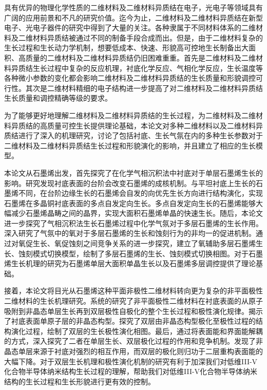 \begin{chineseabstract}
    具有优异的物理化学性质的二维材料及二维材料异质结在电子，光电子等领域具有广阔的应用前景和不凡的研究价值。迄今为止，二维材料及二维材料异质结在新型电子、光电子器件的研究中得到了大量的关注。各种隶属于不同材料体系的二维材料及二维材料异质结被通过不同的制备手段合成而出。但是，由于二维材料复杂的生长过程和生长动力学机制，想要低成本、快速、形貌高可控地生长制备出大面积、高质量的二维材料及二维材料异质结仍旧困难重重。首先是二维材料及二维材料异质结生长过程中复杂的反应机理，衬底化学反应、气相化学反应，生长温度等各种微小参数的变化都会影响二维材料及二维材料异质结的生长质量和形貌调控可行性。其次是二维材料精细的电子结构进一步提高了对二维材料及二维材料异质结生长质量和调控精确等级的要求。
    
    为了能够更好地理解二维材料及二维材料异质结的生长过程，为二维材料及二维材料异质结的高质量可控生长提供理论基础，本论文对多种二维材料以及二维材料异质结进行了深入的机理研究，讨论了包括衬底、生长气氛在内的多种生长参数对于二维材料及二维材料异质结生长过程和形貌演化的影响，并且建立了相应的生长模型。

    本论文从石墨烯出发，首先探究了在化学气相沉积法中衬底对于单层石墨烯生长的影响。研究发现衬底表面的台阶会改变石墨烯的成核机制。与平坦衬底上生长的石墨烯不同，在台阶边缘生长的石墨烯会自发的向优先生长方向进行结构演化，实现石墨烯在多晶铜衬底表面的多点自发定向生长。多点自发定向生长的石墨烯能够大幅减少石墨烯晶畴之间的晶界，实现大面积石墨烯单晶的快速生长。随后，本论文进一步探究了气相沉积法生长石墨烯过程中化学气氛对于多层石墨烯的生长作用。深入研究了气氛中的氧对于多层石墨烯的生长和蚀刻行为的非均一的促进机制。通过对氧促生长、氧促蚀刻之间竞争关系的进一步探究，建立了氧辅助多层石墨烯生长、蚀刻模式切换模型，绘制了多层石墨烯的生长、蚀刻模式切换相图。对于石墨烯生长机理的研究为石墨烯单层大面积单晶生长以及石墨烯多层调控提供了理论基础。

    接着，本论文将目光从石墨烯这种平面非极性二维材料转向更为复杂的非平面极性二维材料的生长机理研究。系统的研究了非平面极性二维材料在衬底表面的从原子吸附到非晶态单层生长再到双层极性自极化的整个生长过程和极性演化规律。揭示了衬底表面单原子层的非晶态构型。探究了双层由非晶态构型极化至极性过程的结构演化过程，绘制了双层的生长极性演化相图。最后，通过将表面能和界面能解耦的方式，深入探究了二者在单层生长、双层极化过程的作用和竞争机制。发现了非晶态单层来源于衬底对强烈的相互作用，而双层的极化则归功于二层重构表面能的大幅下降。对于双层生长机理和极性演化机制的研究有利于加深我们对低维III-V化合物半导体纳米结构生长过程的理解，帮助我们对低维III-V化合物半导体纳米结构的生长过程和生长形貌进行更有效的控制。


\end{chineseabstract}
